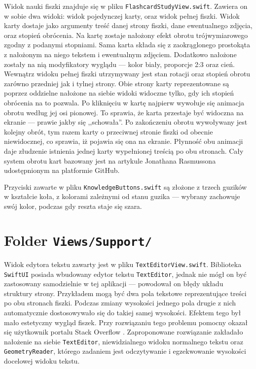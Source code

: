 \documentclass[final,a4paper,openany,12pt]{mwbk}
\begin{document}
Widok nauki fiszki znajduje się w pliku \texttt{FlashcardStudyView.swift}. Zawiera on w sobie dwa widoki: widok pojedynczej karty, oraz widok pełnej fiszki. Widok karty dostaje jako argumenty treść danej strony fiszki, dane ewentualnego zdjęcia, oraz stopień obrócenia. Na kartę zostaje nałożony efekt obrotu trójwymiarowego zgodny z podanymi stopniami. Sama karta składa się z zaokrąglonego prostokąta z nałożonym na niego tekstem i ewentualnym zdjęciem. Dodatkowo nałożone zostały na nią modyfikatory wyglądu --- kolor biały, proporcje 2:3 oraz cień. Wewnątrz widoku pełnej fiszki utrzymywany jest stan rotacji oraz stopień obrotu zarówno przedniej jak i tylnej strony. Obie strony karty reprezentowane są poprzez oddzielne nałożone na siebie widoki widoczne tylko, gdy ich stopień obrócenia na to pozwala. Po kliknięciu w kartę najpierw wywołuje się animacja obrotu według jej osi pionowej. To sprawia, że karta przestaje być widoczna na ekranie --- prawie jakby się ,,schowała''. Po zakończeniu obrotu wywoływany jest kolejny obrót, tym razem karty o przeciwnej stronie fiszki od obecnie niewidocznej, co sprawia, iż pojawia się ona na ekranie. Płynność obu animacji daje złudzenie istnienia jednej karty wypełnionej treścią po obu stronach. Cały system obrotu kart bazowany jest na artykule Jonathana Rasmussona \cite{card_flip} udostępnionym na platformie GitHub.



Przyciski zawarte w pliku \texttt{KnowledgeButtons.swift} są złożone z trzech guzików w kształcie koła, z kolorami zależnymi od stanu guzika --- wybrany zachowuje swój kolor, podczas gdy reszta staje się szara.

\section{Folder \texttt{Views/Support/}}

Widok edytora tekstu zawarty jest w pliku \texttt{TextEditorView.swift}. Biblioteka  \texttt{SwiftUI} posiada wbudowany edytor tekstu \texttt{TextEditor}, jednak nie mógł on być zastosowany samodzielnie w tej aplikacji --- powodował on błędy układu struktury strony. Przykładem mogą być dwa pola tekstowe reprezentujące treści po obu stronach fiszki. Podczas zmiany wysokości jednego pola drugie z nich automatycznie dostosowywało się do takiej samej wysokości. Efektem tego był mało estetyczny wygląd fiszek. Przy rozwiązaniu tego problemu pomocny okazał się użytkownik portalu Stack Overflow \cite{so_texteditor}. Zaproponowane rozwiązanie zakładało nałożenie na siebie \texttt{TextEditor}, niewidzialnego widoku normalnego tekstu oraz \texttt{GeometryReader}, którego zadaniem jest odczytywanie i egzekwowanie wysokości docelowej widoku tekstu. 
\end{document}
